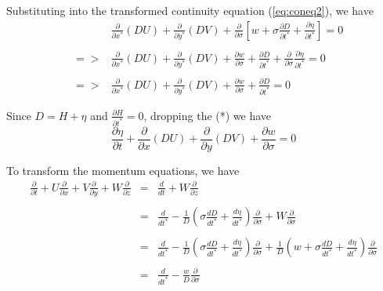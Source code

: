 \documentclass[oribibl]{llncs}
\begin{document}
Substituting into the transformed continuity equation (\ref{eq:coneq2}), we have
\begin{eqnarray}\label{eq:coneq3}
&&\frac{\partial}{\partial x^*}(DU) +\frac{\partial}{\partial y^*}(DV) + \frac{\partial}{\partial \sigma} \left[w+ \sigma \frac{\partial D}{\partial t^*} + \frac{\partial \eta}{\partial t^*} \right] = 0 \nonumber \\ \nonumber \\  
&=>& \frac{\partial}{\partial x^*}(DU) +\frac{\partial}{\partial y^*}(DV) + \frac{\partial w}{\partial \sigma} +\frac{\partial D}{\partial t^*} + \frac{\partial}{\partial \sigma} \frac{\partial \eta}{\partial t^*} = 0  \nonumber \\ \nonumber \\ 
&=>& \frac{\partial}{\partial x^*}(DU) +\frac{\partial}{\partial y^*}(DV) + \frac{\partial w}{\partial \sigma} +\frac{\partial D}{\partial t^*} = 0
\end{eqnarray}

Since $D=H+\eta$ and $\frac{\partial H}{\partial t^*}=0$,  dropping the (*)  we have
\begin{equation}\label{eq:coneq4}
\frac{\partial \eta}{\partial t}+\frac{\partial}{\partial x}(DU) +\frac{\partial}{\partial y}(DV) + \frac{\partial w}{\partial \sigma}= 0 
\end{equation}

To transform the momentum equations, we have
\begin{eqnarray}
\frac{\partial}{\partial t}+U\frac{\partial}{\partial x} + V\frac{\partial}{\partial y}+W\frac{\partial}{\partial z} &=& \frac{d}{dt}+W\frac{\partial}{\partial z} \nonumber \\ \nonumber \\ 
&=&\frac{d}{dt^*} -\frac{1}{D}\left( \sigma \frac{dD}{dt^*} +\frac{d\eta}{dt^*}   \right) \frac{\partial}{\partial \sigma} +W\frac{\partial}{\partial \sigma}  \nonumber \\ \nonumber \\ 
&=&\frac{d}{dt^*} -\frac{1}{D}\left( \sigma \frac{dD}{dt^*} +\frac{d\eta}{dt^*}   \right) \frac{\partial}{\partial \sigma}  +\frac{1}{D}\left( w+ \sigma \frac{dD}{dt^*} +\frac{d\eta}{dt^*} \right) \frac{\partial}{\partial \sigma}  \nonumber \\ \nonumber \\ 
&=&\frac{d}{dt^*} - \frac{w}{D} \frac{\partial}{\partial \sigma}
\end{eqnarray}
\end{document}
